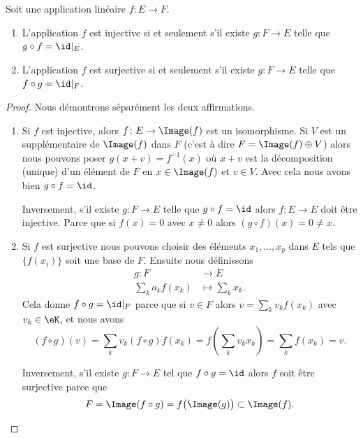 \begin{lemma}        \label{LEMooDAACooElDsYb}
    Soit une application linéaire \( f\colon E\to F\).
    \begin{enumerate}
        \item       \label{ITEMooEZEWooZGoqsZ}
            L'application \( f\) est injective si et seulement s'il existe \( g\colon F\to E\) telle que \( g\circ f=\id|_E\).
        \item
            L'application \( f\) est surjective si et seulement s'il existe \( g\colon F\to E\) telle que \( f\circ g=\id|_F\).
    \end{enumerate}
\end{lemma}

\begin{proof}
    Nous démontrons séparément les deux affirmations.
    \begin{enumerate}
        \item
            Si \( f\) est injective, alors \( f\colon E\to \Image(f)\) est un isomorphisme. Si $V$ est un supplémentaire de \( \Image(f)\) dans \( F\) (c'est à dire \( F=\Image(f)\oplus V\)) alors nous pouvons poser \( g(x+v)=f^{-1}(x)\) où \( x+v\) est la décomposition (unique) d'un élément de \( F\) en \( x\in\Image(f)\) et \( v\in V\). Avec cela nous avons bien \( g\circ f=\id\).

            Inversement, s'il existe \( g\colon F\to E\) telle que \( g\circ f=\id\) alors \( f\colon E\to E\) doit être injective. Parce que si \( f(x)=0\) avec \( x\neq 0\) alors \( (g\circ f)(x)=0\neq x\).
        \item
            Si \( f\) est surjective nous pouvons choisir des éléments \( x_1,\ldots, x_p\) dans \( E\) tels que \( \{ f(x_i) \}\) soit une base de \( F\). Ensuite nous définissons
            \begin{equation}
                \begin{aligned}
                    g\colon F&\to E \\
                    \sum_ka_kf(x_k)&\mapsto \sum_kx_k. 
                \end{aligned}
            \end{equation}
            Cela donne \(  f\circ g=\id|_F\) parce que si \( v\in F\) alors \( v=\sum_kv_kf(x_k)\) avec \( v_k\in \eK\), et nous avons
            \begin{equation}
                (f\circ g)(v)=\sum_kv_k(f\circ g)f(x_k)=f\left( \sum_kv_kx_k \right)=\sum_kf(x_k)=v.
            \end{equation}
            
            Inversement, s'il existe \( g\colon F\to E\) tel que \( f\circ g=\id\) alors \( f\) soit être surjective parce que 
            \begin{equation}
                F=\Image(f\circ g)=f\big( \Image(g) \big)\subset \Image(f).
            \end{equation}
    \end{enumerate}
\end{proof}


